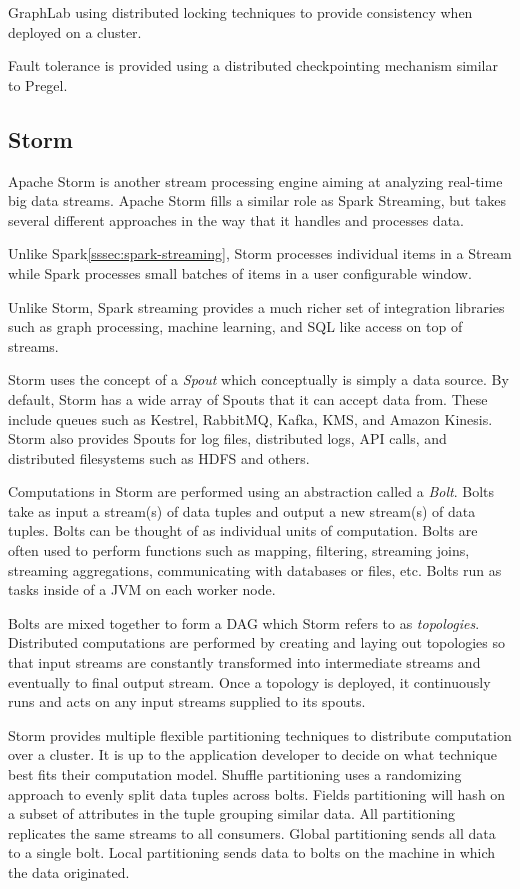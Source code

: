 \documentclass[]{article}
\begin{document}
GraphLab using distributed locking techniques to provide consistency when deployed on a cluster.

Fault tolerance is provided using a distributed checkpointing mechanism similar to Pregel.

\subsection{Storm}\label{ssec:storm}
Apache Storm\cite{storm}\cite{ballou2014}\cite{scott2016} is another stream processing engine aiming at analyzing real-time big data streams. Apache Storm fills a similar role as Spark Streaming, but takes several different approaches in the way that it handles and processes data.

Unlike Spark\ref{sssec:spark-streaming}, Storm processes individual items in a Stream while Spark processes small batches of items in a user configurable window.

Unlike Storm, Spark streaming provides a much richer set of integration libraries such as graph processing, machine learning, and SQL like access on top of streams. 

Storm uses the concept of a \textit{Spout} which conceptually is simply a data source. By default, Storm has a wide array of Spouts that it can accept data from. These include queues such as Kestrel, RabbitMQ, Kafka, KMS, and Amazon Kinesis. Storm also provides Spouts for log files, distributed logs, API calls, and distributed filesystems such as HDFS and others.

Computations in Storm are performed using an abstraction called a \textit{Bolt}. Bolts take as input a stream(s) of data tuples and output a new stream(s) of data tuples. Bolts can be thought of as individual units of computation. Bolts are often used to perform functions such as mapping, filtering, streaming joins, streaming aggregations, communicating with databases or files, etc. Bolts run as tasks inside of a JVM on each worker node. 

Bolts are mixed together to form a DAG which Storm refers to as \textit{topologies}. Distributed computations are performed by creating and laying out topologies so that input streams are constantly transformed into intermediate streams and eventually to final output stream. Once a topology is deployed, it continuously runs and acts on any input streams supplied to its spouts.

Storm provides multiple flexible partitioning techniques to distribute computation over a cluster. It is up to the application developer to decide on what technique best fits their computation model. Shuffle partitioning uses a randomizing approach to evenly split data tuples across bolts. Fields partitioning will hash on a subset of attributes in the tuple grouping similar data. All partitioning replicates the same streams to all consumers. Global partitioning sends all data to a single bolt. Local partitioning sends data to bolts on the machine in which the data originated\cite{toshniwal2014storm}. 
\end{document}

